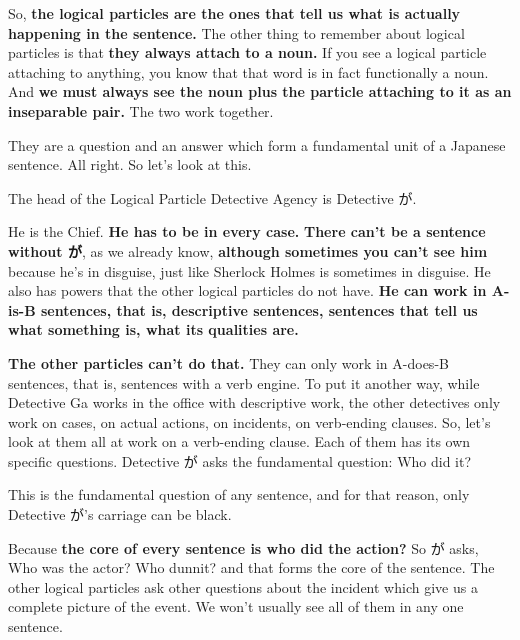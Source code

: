 {}

So, {\bf the logical particles are the ones that tell us what is actually happening in the sentence.} The other thing to remember about logical particles is that {\bf they always attach to a noun.} If you see a logical particle attaching to anything, you know that that word is in fact functionally a noun. And {\bf we must always see the noun plus the particle attaching to it as an inseparable pair.} The two work together.

{}

They are a question and an answer which form a fundamental unit of a Japanese sentence. All right. So let's look at this.

\startsectionlevel[title={Particle が},reference={particle-が}]

The head of the Logical Particle Detective Agency is Detective が.

{}

He is the Chief. {\bf He has to be in every case.} {\bf There can't be a sentence without が}, as we already know, {\bf although sometimes you can't see him} because he's in disguise, just like Sherlock Holmes is sometimes in disguise. He also has powers that the other logical particles do not have. {\bf He can work in A-is-B sentences, that is, descriptive sentences, sentences that tell us what something is, what its qualities are.}

\thinrule

{\bf The other particles can't do that.} They can only work in A-does-B sentences, that is, sentences with a verb engine. To put it another way, while Detective Ga works in the office with descriptive work, the other detectives only work on cases, on actual actions, on incidents, on verb-ending clauses. So, let's look at them all at work on a verb-ending clause. Each of them has its own specific questions. Detective が asks the fundamental question: Who did it?

This is the fundamental question of any sentence, and for that reason, only Detective が's carriage can be black.

{}

Because {\bf the core of every sentence is who did the action?} So が asks, Who was the actor? Who dunnit? and that forms the core of the sentence. The other logical particles ask other questions about the incident which give us a complete picture of the event. We won't usually see all of them in any one sentence.

